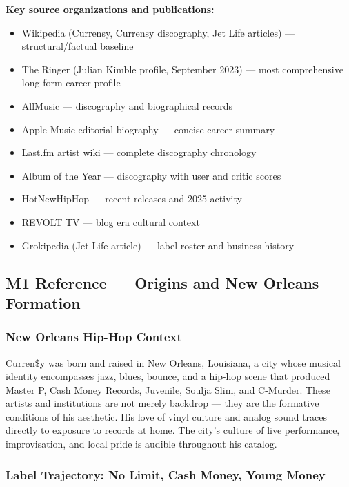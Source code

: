 \documentclass[11pt,letterpaper]{article}
\begin{document}
\textbf{Key source organizations and publications:}
\begin{itemize}[leftmargin=1.5em]
  \item Wikipedia (Currensy, Currensy discography, Jet Life articles) — structural/factual baseline
  \item The Ringer (Julian Kimble profile, September 2023) — most comprehensive long-form career profile
  \item AllMusic — discography and biographical records
  \item Apple Music editorial biography — concise career summary
  \item Last.fm artist wiki — complete discography chronology
  \item Album of the Year — discography with user and critic scores
  \item HotNewHipHop — recent releases and 2025 activity
  \item REVOLT TV — blog era cultural context
  \item Grokipedia (Jet Life article) — label roster and business history
\end{itemize}

\subsection{M1 Reference — Origins and New Orleans Formation}

\subsubsection{New Orleans Hip-Hop Context}

Curren\$y was born and raised in New Orleans, Louisiana, a city whose musical identity encompasses jazz, blues, bounce, and a hip-hop scene that produced Master P, Cash Money Records, Juvenile, Soulja Slim, and C-Murder. These artists and institutions are not merely backdrop — they are the formative conditions of his aesthetic. His love of vinyl culture and analog sound traces directly to exposure to records at home. The city's culture of live performance, improvisation, and local pride is audible throughout his catalog.

\subsubsection{Label Trajectory: No Limit, Cash Money, Young Money}
\end{document}
